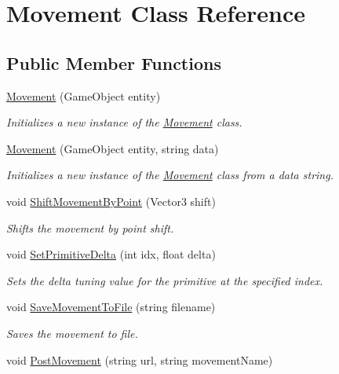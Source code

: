 \hypertarget{class_movement}{\section{Movement Class Reference}
\label{class_movement}
}
\subsection*{Public Member Functions}
\begin{DoxyCompactItemize}
\item 
\hyperlink{class_movement_a2cd07ea790360649ed8db473a1e02823}{Movement} (Game\+Object entity)
\begin{DoxyCompactList}\small\item\em Initializes a new instance of the \hyperlink{class_movement}{Movement} class. \end{DoxyCompactList}\item 
\hyperlink{class_movement_abe2a48fcbef5772967495840006aaa5f}{Movement} (Game\+Object entity, string data)
\begin{DoxyCompactList}\small\item\em Initializes a new instance of the \hyperlink{class_movement}{Movement} class from a data string. \end{DoxyCompactList}\item 
void \hyperlink{class_movement_a0a22e489295fdb2a476024bab0856e90}{Shift\+Movement\+By\+Point} (Vector3 shift)
\begin{DoxyCompactList}\small\item\em Shifts the movement by point shift. \end{DoxyCompactList}\item 
void \hyperlink{class_movement_acb5d6cff93af0c96019b9b13211baa22}{Set\+Primitive\+Delta} (int idx, float delta)
\begin{DoxyCompactList}\small\item\em Sets the delta tuning value for the primitive at the specified index. \end{DoxyCompactList}\item 
void \hyperlink{class_movement_a466cb726a724959f72e15f06eefbfdd1}{Save\+Movement\+To\+File} (string filename)
\begin{DoxyCompactList}\small\item\em Saves the movement to file. \end{DoxyCompactList}\item 
void \hyperlink{class_movement_aaf5b772659fa5dd81d4ad8640429b04c}{Post\+Movement} (string url, string movement\+Name)

\end{DoxyCompactItemize}
